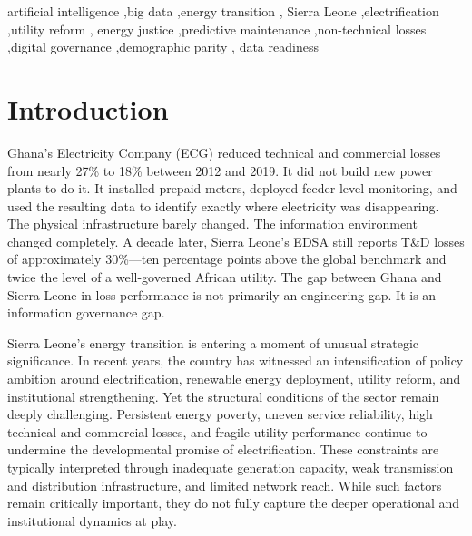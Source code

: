 \documentclass[preprint,12pt]{elsarticle}
\begin{document}
\begin{frontmatter}
\begin{keyword}
artificial intelligence \sep big data \sep energy transition \sep
Sierra Leone \sep electrification \sep utility reform \sep
energy justice \sep predictive maintenance \sep non-technical
losses \sep digital governance \sep demographic parity \sep
data readiness
\end{keyword}

\end{frontmatter}

\onehalfspacing

\section{Introduction}
\label{sec:intro}

Ghana's Electricity Company (ECG) reduced technical and commercial
losses from nearly 27\% to 18\% between 2012 and 2019. It did not
build new power plants to do it. It installed prepaid meters,
deployed feeder-level monitoring, and used the resulting data to
identify exactly where electricity was disappearing. The physical
infrastructure barely changed. The information environment changed
completely. A decade later, Sierra Leone's EDSA still reports
T\&D losses of approximately 30\%---ten percentage points above
the global benchmark and twice the level of a well-governed
African utility. The gap between Ghana and Sierra Leone in loss
performance is not primarily an engineering gap. It is an
information governance gap.

Sierra Leone's energy transition is entering a moment of unusual
strategic significance. In recent years, the country has witnessed
an intensification of policy ambition around electrification,
renewable energy deployment, utility reform, and institutional
strengthening. Yet the structural conditions of the sector remain
deeply challenging. Persistent energy poverty, uneven service
reliability, high technical and commercial losses, and fragile
utility performance continue to undermine the developmental promise
of electrification. These constraints are typically interpreted
through inadequate generation capacity, weak transmission and
distribution infrastructure, and limited network reach. While
such factors remain critically important, they do not fully capture
the deeper operational and institutional dynamics at play.
\end{document}
